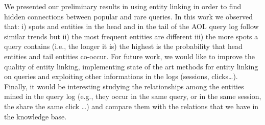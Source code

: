 We presented our preliminary results in using entity linking in order
to find hidden connections between popular and rare queries. 
In this work we observed that: i) spots and entities 
in the head and in the tail of the AOL query log follow similar trends but ii) 
the most frequent entities are different iii) the more spots a query contains 
(i.e., the longer it is) the highest is the probability that head entities and
tail entities co-occur. For future work, we would like to improve the quality 
of entity linking, implementing state of the art methods for entity linking on queries and
exploiting other informations in the logs (sessions, clicks\dots). Finally, it would 
be interesting studying the relationships among the entities mined in the query log
(e.g., they occur in the same query, or in the same session, the share the same click \dots) and
compare them with the relations that we have in the knowledge base.
